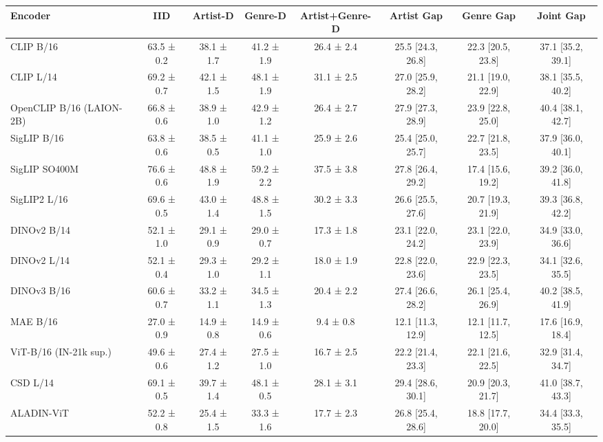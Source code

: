 \begin{tabular}{lccccccc}
\toprule
Encoder & IID & Artist-D & Genre-D & Artist+Genre-D & Artist Gap & Genre Gap & Joint Gap \\
\midrule
CLIP B/16 & 63.5 ± 0.2 & 38.1 ± 1.7 & 41.2 ± 1.9 & 26.4 ± 2.4 & 25.5 [24.3, 26.8] & 22.3 [20.5, 23.8] & 37.1 [35.2, 39.1] \\
CLIP L/14 & 69.2 ± 0.7 & 42.1 ± 1.5 & 48.1 ± 1.9 & 31.1 ± 2.5 & 27.0 [25.9, 28.2] & 21.1 [19.0, 22.9] & 38.1 [35.5, 40.2] \\
OpenCLIP B/16 (LAION-2B) & 66.8 ± 0.6 & 38.9 ± 1.0 & 42.9 ± 1.2 & 26.4 ± 2.7 & 27.9 [27.3, 28.9] & 23.9 [22.8, 25.0] & 40.4 [38.1, 42.7] \\
SigLIP B/16 & 63.8 ± 0.6 & 38.5 ± 0.5 & 41.1 ± 1.0 & 25.9 ± 2.6 & 25.4 [25.0, 25.7] & 22.7 [21.8, 23.5] & 37.9 [36.0, 40.1] \\
SigLIP SO400M & 76.6 ± 0.6 & 48.8 ± 1.9 & 59.2 ± 2.2 & 37.5 ± 3.8 & 27.8 [26.4, 29.2] & 17.4 [15.6, 19.2] & 39.2 [36.0, 41.8] \\
SigLIP2 L/16 & 69.6 ± 0.5 & 43.0 ± 1.4 & 48.8 ± 1.5 & 30.2 ± 3.3 & 26.6 [25.5, 27.6] & 20.7 [19.3, 21.9] & 39.3 [36.8, 42.2] \\
DINOv2 B/14 & 52.1 ± 1.0 & 29.1 ± 0.9 & 29.0 ± 0.7 & 17.3 ± 1.8 & 23.1 [22.0, 24.2] & 23.1 [22.0, 23.9] & 34.9 [33.0, 36.6] \\
DINOv2 L/14 & 52.1 ± 0.4 & 29.3 ± 1.0 & 29.2 ± 1.1 & 18.0 ± 1.9 & 22.8 [22.0, 23.6] & 22.9 [22.3, 23.5] & 34.1 [32.6, 35.5] \\
DINOv3 B/16 & 60.6 ± 0.7 & 33.2 ± 1.1 & 34.5 ± 1.3 & 20.4 ± 2.2 & 27.4 [26.6, 28.2] & 26.1 [25.4, 26.9] & 40.2 [38.5, 41.9] \\
MAE B/16 & 27.0 ± 0.9 & 14.9 ± 0.8 & 14.9 ± 0.6 & 9.4 ± 0.8 & 12.1 [11.3, 12.9] & 12.1 [11.7, 12.5] & 17.6 [16.9, 18.4] \\
ViT-B/16 (IN-21k sup.) & 49.6 ± 0.6 & 27.4 ± 1.2 & 27.5 ± 1.0 & 16.7 ± 2.5 & 22.2 [21.4, 23.3] & 22.1 [21.6, 22.5] & 32.9 [31.4, 34.7] \\
CSD L/14 & 69.1 ± 0.5 & 39.7 ± 1.4 & 48.1 ± 0.5 & 28.1 ± 3.1 & 29.4 [28.6, 30.1] & 20.9 [20.3, 21.7] & 41.0 [38.7, 43.3] \\
ALADIN-ViT & 52.2 ± 0.8 & 25.4 ± 1.5 & 33.3 ± 1.6 & 17.7 ± 2.3 & 26.8 [25.4, 28.6] & 18.8 [17.7, 20.0] & 34.4 [33.3, 35.5] \\
\bottomrule
\end{tabular}
